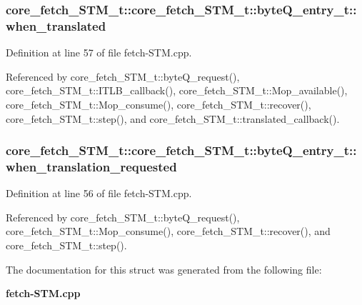 \subsubsection[{when\_\-translated}]{ core\_\-fetch\_\-STM\_\-t::core\_\-fetch\_\-STM\_\-t::byteQ\_\-entry\_\-t::when\_\-translated}\label{structcore__fetch__STM__t_1_1byteQ__entry__t_7d9cf6788941d693bff318d90a9b6d09}




Definition at line 57 of file fetch-STM.cpp.

Referenced by core\_\-fetch\_\-STM\_\-t::byteQ\_\-request(), core\_\-fetch\_\-STM\_\-t::ITLB\_\-callback(), core\_\-fetch\_\-STM\_\-t::Mop\_\-available(), core\_\-fetch\_\-STM\_\-t::Mop\_\-consume(), core\_\-fetch\_\-STM\_\-t::recover(), core\_\-fetch\_\-STM\_\-t::step(), and core\_\-fetch\_\-STM\_\-t::translated\_\-callback().
\subsubsection[{when\_\-translation\_\-requested}]{ core\_\-fetch\_\-STM\_\-t::core\_\-fetch\_\-STM\_\-t::byteQ\_\-entry\_\-t::when\_\-translation\_\-requested}\label{structcore__fetch__STM__t_1_1byteQ__entry__t_dc1ca63643c451db7587513defd97b5c}




Definition at line 56 of file fetch-STM.cpp.

Referenced by core\_\-fetch\_\-STM\_\-t::byteQ\_\-request(), core\_\-fetch\_\-STM\_\-t::Mop\_\-consume(), core\_\-fetch\_\-STM\_\-t::recover(), and core\_\-fetch\_\-STM\_\-t::step().

The documentation for this struct was generated from the following file:\begin{CompactItemize}
\item 
{\bf fetch-STM.cpp}\end{CompactItemize}
